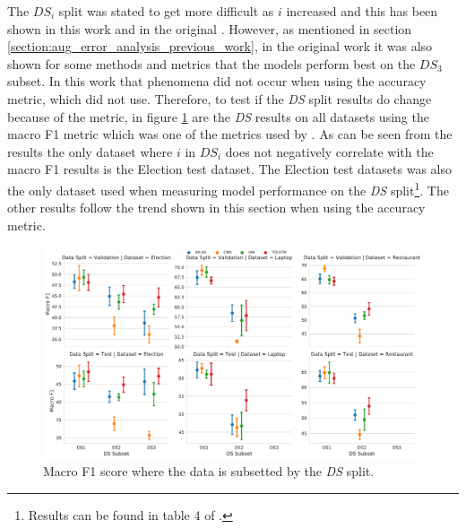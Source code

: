 The $DS_i$ split was stated to get more difficult as $i$ increased and this has been shown in this work and in the original \citep{wang-etal-2017-tdparse}. However, as mentioned in section \ref{section:aug_error_analysis_previous_work}, in the original work it was also shown for some methods and metrics that the models perform best on the $DS_3$ subset. In this work that phenomena did not occur when using the accuracy metric, which \citet{wang-etal-2017-tdparse} did not use. Therefore, to test if the \textit{DS} split results do change because of the metric, in figure \ref{fig:aug_baseline_sentiment_f1_ds_all} are the \textit{DS} results on all datasets using the macro F1 metric which was one of the metrics used by \citet{wang-etal-2017-tdparse}. As can be seen from the results the only dataset where $i$ in $DS_i$ does not negatively correlate with the macro F1 results is the Election test dataset. The Election test datasets was also the only dataset \citet{wang-etal-2017-tdparse} used when measuring model performance on the \textit{DS} split\footnote{Results can be found in table 4 of \citet{wang-etal-2017-tdparse}.}. The other results follow the trend shown in this section when using the accuracy metric. 

\begin{figure}[h!]
    \centering
    \includegraphics[scale=0.38]{images/augmentation/methods_performance/baseline/sentiment_f1_ds_all.pdf}
    \caption{Macro F1 score where the data is subsetted by the \textit{DS} split.}
    \label{fig:aug_baseline_sentiment_f1_ds_all}
\end{figure}

